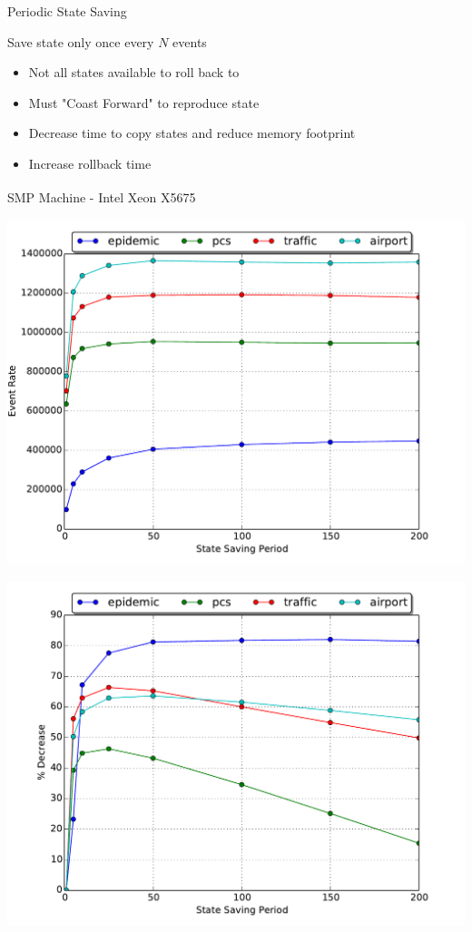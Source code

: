 \documentclass[10pt]{beamer}
\begin{document}
\begin{frame}{Periodic State Saving}
    \begin{block}{Save state only once every $N$ events}
        \begin{itemize}
            \item Not all states available to roll back to
            \item Must "Coast Forward" to reproduce state
            \item Decrease time to copy states and reduce memory footprint
            \item Increase rollback time
        \end{itemize}
    \end{block}
    \begin{block}{SMP Machine - Intel\textsuperscript{\textregistered} Xeon\textsuperscript{\textregistered} X5675}
        \smallskip
        \begin{minipage}{0.5\textwidth}
            \includegraphics[width=\textwidth]{../figs/state_saving/bc/eventrate.pdf}
        \end{minipage}%
        \begin{minipage}{0.5\textwidth}
            \includegraphics[width=\textwidth]{../figs/state_saving/bc/percent_memory_decrease.pdf}

\end{minipage}
\end{block}
\end{frame}
\end{document}
